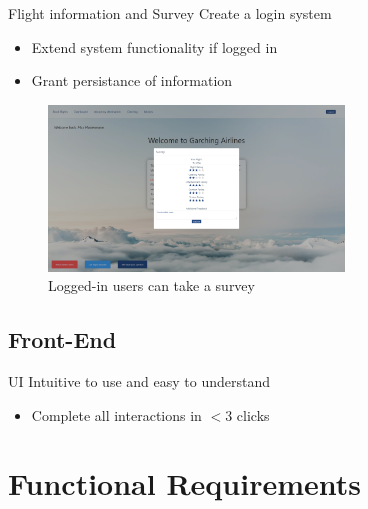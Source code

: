 \documentclass{beamer}
\begin{document}
\begin{frame}{Flight information and Survey}
	Create a login system
	\begin{itemize}
		\item Extend system functionality if logged in
		\item Grant persistance of information
	\end{itemize}
	\begin{figure}
		\includegraphics[width=0.7\textwidth]{../images/survey.png}
		\caption{Logged-in users can take a survey}
	\end{figure}
\end{frame}
%
\subsection{Front-End}
\begin{frame}{UI}
	Intuitive to use and easy to understand
	\begin{itemize}
		\item Complete all interactions in $< 3$ clicks
	\end{itemize}
\end{frame}
%
\section{Functional Requirements}
\end{document}
